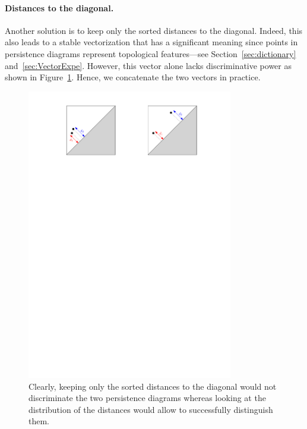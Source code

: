 \paragraph*{Distances to the diagonal.} 
Another solution is to keep only the sorted distances to the diagonal.
Indeed, this also leads to a stable vectorization that has a significant meaning
since points in persistence diagrams represent topological features---see 
Section~\ref{sec:dictionary} and~\ref{sec:VectorExpe}. 
However, this vector alone lacks discriminative power 
as shown in Figure~\ref{fig:diagpts}. Hence, we concatenate the two vectors in practice.
%
\begin{figure}[h] 
\begin{center} 
\includegraphics[width = 9cm]{figures/CounterExampleBarPD}
\caption[Distances to diagonal]{\label{fig:diagpts}
Clearly, keeping only the sorted distances to the diagonal would not
discriminate the two persistence diagrams whereas looking at the distribution
of the distances would allow to successfully distinguish them.} 
\end{center} 
\end{figure}




